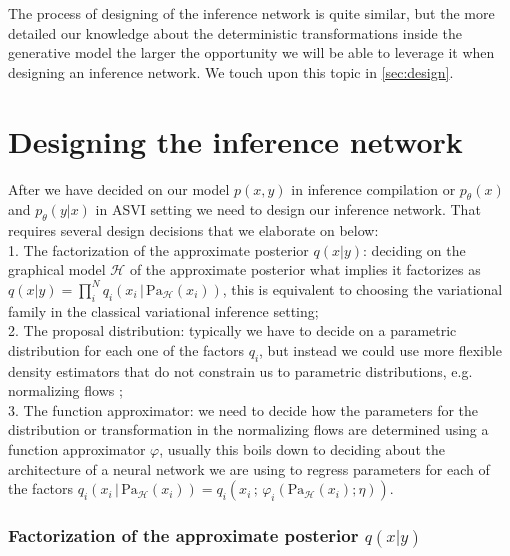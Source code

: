 \documentclass[12pt]{article}
\begin{document}
The process of designing of the inference network is quite similar, but the more detailed our knowledge about the deterministic transformations inside the generative model the larger the opportunity we will be able to leverage it when designing an inference network.
We touch upon this topic in \autoref{sec:design}.




\section{Designing the inference network}
\label{sec:design}

After we have decided on our model $p(x,y)$ in inference compilation or $p_\theta(x)$ and $p_\theta(y|x)$ in ASVI setting we need to design our inference network. 
That requires several design decisions that we elaborate on below:\\
1. The factorization of the approximate posterior $q(x|y)$: deciding on the graphical model $\mathcal{H}$ of the approximate posterior what implies it factorizes as $q(x|y)=\prod^N_iq_i(x_i\,|\,\text{Pa}_\mathcal{H}(x_i))$, this is equivalent to choosing the variational family in the classical variational inference setting;\\
2. The proposal distribution: typically we have to decide on a parametric distribution for each one of the factors $q_i$, but instead we could use more flexible density estimators that do not constrain us to parametric distributions, e.g. normalizing flows \citep{RezendeMohamed2015}; \\
3. The function approximator: we need to decide how the parameters for the distribution or transformation in the normalizing flows are determined using a function approximator $\varphi$, usually this boils down to deciding about the architecture of a neural network we are using to regress parameters for each of the factors 
$q_i(x_i\,|\,\text{Pa}_\mathcal{H}(x_i)) = q_i(x_i\,;\,\varphi_i(\text{Pa}_\mathcal{H}(x_i); \eta))$.\\


\subsubsection*{Factorization of the approximate posterior $q(x|y)$}

\end{document}
